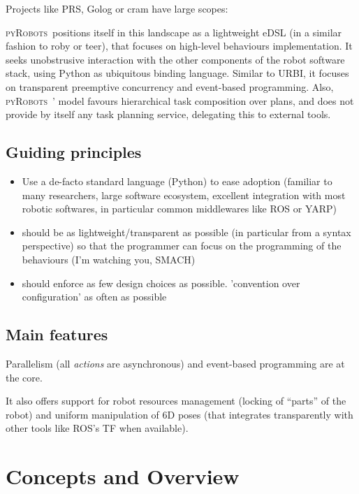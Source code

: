 \documentclass[a4paper, 10pt, conference]{ieeeconf}      %
\newcommand{\pyRobots}{\textsc{pyRobots}\ }
\begin{document}
Projects like PRS, Golog or {\sc cram} have large scopes:


\pyRobots positions itself in this landscape as a lightweight eDSL (in a similar
fashion to {\sc roby} or {\sc teer}), that focuses on high-level behaviours
implementation. It seeks unobstrusive interaction with the other components of
the robot software stack, using Python as ubiquitous binding language. Similar
to URBI, it focuses on transparent preemptive concurrency and event-based programming.
Also, \pyRobots' model favours hierarchical task composition over plans, and does not
provide by itself any task planning service, delegating this to external tools.

\subsection{Guiding principles}

\begin{itemize}
    \item Use a de-facto standard language (Python) to ease adoption (familiar to
        many researchers, large software ecosystem, excellent integration with
        most robotic softwares, in particular common middlewares like ROS or
        YARP)
    \item should be as lightweight/transparent as possible (in particular from a
        syntax perspective) so that the
        programmer can focus on the programming of the behaviours (I'm
        watching you, SMACH)
    \item should enforce as few design choices as possible. 'convention over
        configuration' as often as possible
\end{itemize}

\subsection{Main features}

Parallelism (all \emph{actions} are asynchronous) and event-based programming
are at the core.

It also offers support for robot resources management (locking of ``parts'' of
the robot) and uniform manipulation of 6D poses (that integrates transparently
with other tools like ROS's TF when available).

\section{Concepts and Overview}
\end{document}
